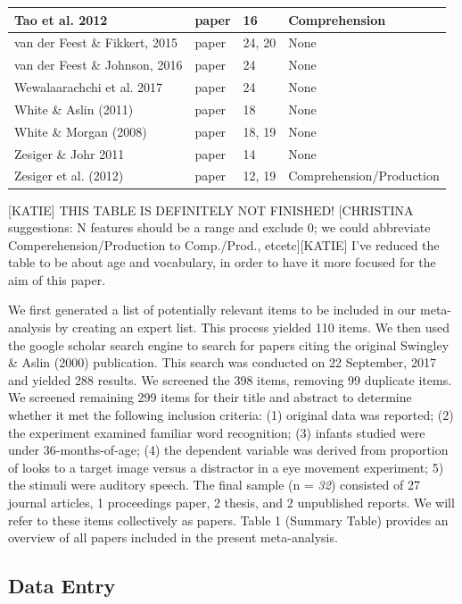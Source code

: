 \documentclass[man]{apa6}
\theoremstyle{definition}
\theoremstyle{definition}
\theoremstyle{definition}
\theoremstyle{remark}
\begin{document}
\begin{tabular}{l|l|l|l}
\hline
Tao et al. 2012 & paper & 16 & Comprehension\\
\hline
van der Feest \& Fikkert, 2015 & paper & 24, 20 & None\\
\hline
van der Feest \& Johnson, 2016 & paper & 24 & None\\
\hline
Wewalaarachchi et al. 2017 & paper & 24 & None\\
\hline
White \& Aslin (2011) & paper & 18 & None\\
\hline
White \& Morgan (2008) & paper & 18, 19 & None\\
\hline
Zesiger \& Johr 2011 & paper & 14 & None\\
\hline
Zesiger et al. (2012) & paper & 12, 19 & Comprehension/Production\\
\hline
\end{tabular}

{[}KATIE{]} THIS TABLE IS DEFINITELY NOT FINISHED! {[}CHRISTINA
suggestions: N features should be a range and exclude 0; we could
abbreviate Comperehension/Production to Comp./Prod.,
etcetc{]}{[}KATIE{]} I've reduced the table to be about age and
vocabulary, in order to have it more focused for the aim of this paper.

We first generated a list of potentially relevant items to be included
in our meta-analysis by creating an expert list. This process yielded
110 items. We then used the google scholar search engine to search for
papers citing the original Swingley \& Aslin (2000) publication. This
search was conducted on 22 September, 2017 and yielded 288 results. We
screened the 398 items, removing 99 duplicate items. We screened
remaining 299 items for their title and abstract to determine whether it
met the following inclusion criteria: (1) original data was reported;
(2) the experiment examined familiar word recognition; (3) infants
studied were under 36-months-of-age; (4) the dependent variable was
derived from proportion of looks to a target image versus a distractor
in a eye movement experiment; 5) the stimuli were auditory speech. The
final sample (n = \emph{32}) consisted of 27 journal articles, 1
proceedings paper, 2 thesis, and 2 unpublished reports. We will refer to
these items collectively as papers. Table 1 (Summary Table) provides an
overview of all papers included in the present meta-analysis.

\subsection{Data Entry}\label{data-entry}
\end{document}
